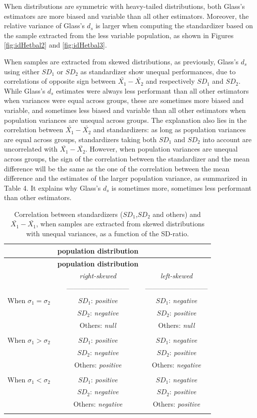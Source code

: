 \documentclass[
  man,floatsintext]{apa6}
\begin{document}
When distributions are symmetric with heavy-tailed distributions, both Glass's estimators are more biased and variable than all other estimators. Moreover, the relative variance of Glass's \(d_s\) is larger when computing the standardizer based on the sample extracted from the less variable population, as shown in Figures \ref{fig:idHetbal2} and \ref{fig:idHetbal3}.

When samples are extracted from skewed distributions, as previously, Glass's \(d_s\) using either \(SD_1\) or \(SD_2\) as standardizer show unequal performances, due to correlations of opposite sign between \(\bar{X_1}-\bar{X_2}\) and respectively \(SD_1\) and \(SD_2\). While Glass's \(d_s\) estimates were always less performant than all other estimators when variances were equal across groups, these are sometimes more biased and variable, and sometimes less biased and variable than all other estimators when population variances are unequal across groups. The explanation also lies in the correlation between \(\bar{X_1}-\bar{X_2}\) and standardizers: as long as population variances are equal across groups, standardizers taking both \(SD_1\) and \(SD_2\) into account are uncorrelated with \(\bar{X_1}-\bar{X_2}\). However, when population variances are unequal across groups, the sign of the correlation between the standardizer and the mean difference will be the same as the one of the correlation between the mean difference and the estimates of the larger population variance, as summarized in Table 4. It explains why Glass's \(d_s\) is sometimes more, sometimes less performant than other estimators.

\newpage

\begin{longtable}[]{@{}lcc@{}}
\caption{Correlation between standardizers (\(SD_1\),\(SD_2\) and others) and \(\bar{X_1}-\bar{X_1}\), when samples are extracted from skewed distributions with unequal variances, as a function of the SD-ratio.}\tabularnewline
\toprule
& \textbf{\textbf{population distribution}} &\tabularnewline
\midrule
\endfirsthead
\toprule
& \textbf{\textbf{population distribution}} &\tabularnewline
\midrule
\endhead
& \emph{right-skewed} & \emph{left-skewed}\tabularnewline
& --------------------------- & ---------------------------\tabularnewline
When \(\sigma_1=\sigma_2\) & \(SD_1\): \emph{positive} & \(SD_1\): \emph{negative}\tabularnewline
& \(SD_2\): \emph{negative} & \(SD_2\): \emph{positive}\tabularnewline
& Others: \emph{null} & Others: \emph{null}\tabularnewline
& &\tabularnewline
When \(\sigma_1>\sigma_2\) & \(SD_1\): \emph{positive} & \(SD_1\): \emph{negative}\tabularnewline
& \(SD_2\): \emph{negative} & \(SD_2\): \emph{positive}\tabularnewline
& Others: \emph{positive} & Others: \emph{negative}\tabularnewline
& &\tabularnewline
When \(\sigma_1<\sigma_2\) & \(SD_1\): \emph{positive} & \(SD_1\): \emph{negative}\tabularnewline
& \(SD_2\): \emph{negative} & \(SD_2\): \emph{positive}\tabularnewline
& Others: \emph{negative} & Others: \emph{positive}\tabularnewline
& &\tabularnewline
\bottomrule
\end{longtable}
\end{document}
